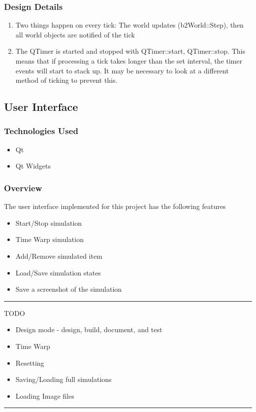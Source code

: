 \subsubsection*{Design Details}
\begin{enumerate}
	\item Two things happen on every tick: The world updates (b2World::Step), then all world objects are notified of the tick
	\item The QTimer is started and stopped with QTimer::start, QTimer::stop. This means that if processing a tick takes longer than the set interval, the timer events will start to stack up. It may be necessary to look at a different method of ticking to prevent this.
\end{enumerate}

\subsection{User Interface}
\subsubsection*{Technologies Used}
\begin{itemize}
	\item Qt
	\item Qt Widgets
\end{itemize}
\subsubsection*{Overview}
The user interface implemented for this project has the following features
\begin{itemize}
	\item Start/Stop simulation
	\item Time Warp simulation
	\item Add/Remove simulated item
	\item Load/Save simulation states
	\item Save a screenshot of the simulation
\end{itemize}

\hrule
TODO
\begin{itemize}
	\item Design mode - design, build, document, and test
	\item Time Warp
	\item Resetting
	\item Saving/Loading full simulations
	\item Loading Image files
\end{itemize}
\hrule

